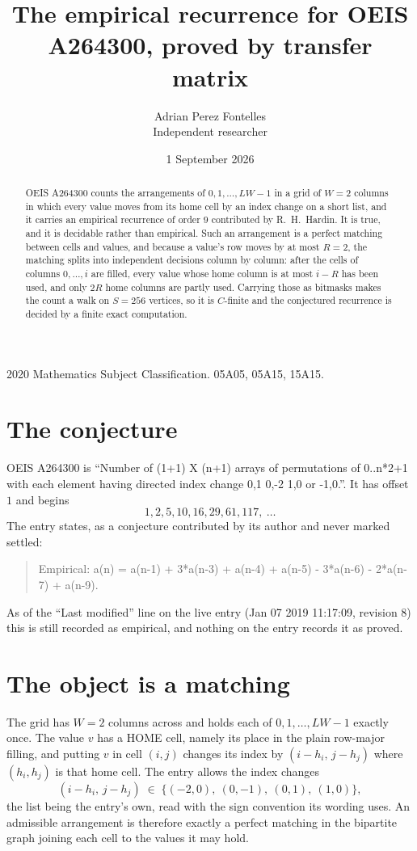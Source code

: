 \documentclass[11pt,a4paper]{article}
\title{The empirical recurrence for OEIS A264300, proved by transfer matrix}
\author{Adrian Perez Fontelles\\ \small Independent researcher}
\date{1 September 2026}
\theoremstyle{plain}
\theoremstyle{definition}
\begin{document}
\maketitle

\begin{abstract}
OEIS A264300 counts the arrangements of $0,1,\dots,LW-1$ in a grid of $W=2$ columns in which
every value moves from its home cell by an index change on a short list, and it carries an
empirical recurrence of order $9$ contributed by R.~H.~Hardin. It is true, and it is
decidable rather than empirical. Such an arrangement is a perfect matching between cells and
values, and because a value's row moves by at most $R=2$, the matching splits into
independent decisions column by column: after the cells of columns $0,\dots,i$ are filled,
every value whose home column is at most $i-R$ has been used, and only $2R$ home columns are
partly used. Carrying those as bitmasks makes the count a walk on $S=256$ vertices, so it is
$C$-finite and the conjectured recurrence is decided by a finite exact computation.
\end{abstract}

\noindent\small 2020 Mathematics Subject Classification. 05A05, 05A15, 15A15.\normalsize

\section{The conjecture}

OEIS A264300 is ``Number of (1+1) X (n+1) arrays of permutations of 0..n*2+1 with each element having directed index change 0,1 0,-2 1,0 or -1,0.''. It has offset $1$ and begins
\[
1, 2, 5, 10, 16, 29, 61, 117,\ \dots
\]
The entry states, as a conjecture contributed by its author and never marked settled:
\begin{quote}
Empirical: a(n) = a(n-1) + 3*a(n-3) + a(n-4) + a(n-5) - 3*a(n-6) - 2*a(n-7) + a(n-9).
\end{quote}
As of the ``Last modified'' line on the live entry (Jan 07 2019 11:17:09, revision 8) this is still
recorded as empirical, and nothing on the entry records it as proved.

\section{The object is a matching}

The grid has $W=2$ columns across and holds each of $0,1,\dots,LW-1$ exactly once. The value
$v$ has a HOME cell, namely its place in the plain row-major filling, and putting $v$ in cell
$(i,j)$ changes its index by $(i-h_i,\,j-h_j)$ where $(h_i,h_j)$ is that home cell. The entry
allows the index changes
\[
(i-h_i,\,j-h_j)\;\in\;\{(-2,0),\ (0,-1),\ (0,1),\ (1,0)\},
\]
the list being the entry's own, read with the sign convention its wording uses. An admissible
arrangement is therefore exactly a perfect matching in the bipartite graph joining each cell to
the values it may hold.
\end{document}
